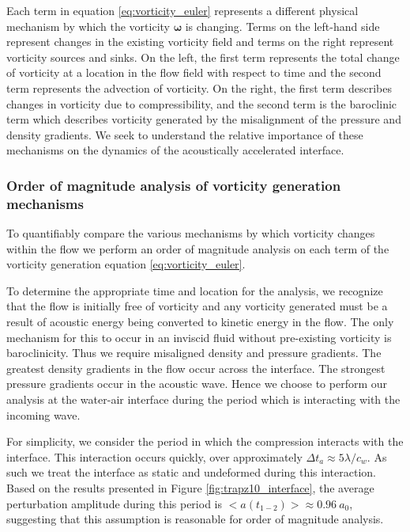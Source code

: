 Each term in equation \eqref{eq:vorticity_euler} represents a
different physical mechanism by which the vorticity
$\boldsymbol{\omega}$ is changing. Terms on the left-hand side
represent changes in the existing vorticity field and terms on the
right represent vorticity sources and sinks. On the left, the first
term represents the total change of vorticity at a location in the
flow field with respect to time and the second term represents the
advection of vorticity. On the right, the first term describes changes
in vorticity due to compressibility, and the second term is the
baroclinic term which describes vorticity generated by the
misalignment of the pressure and density gradients. We
seek to understand the relative importance of these mechanisms on the
dynamics of the acoustically accelerated interface.
% 
% 
\subsubsection{Order of magnitude analysis of vorticity generation mechanisms}
\label{subsubsec:oom_analysis}
To quantifiably compare the various mechanisms by which vorticity
changes within the flow we perform an order of magnitude analysis on
each term of the vorticity generation equation
\eqref{eq:vorticity_euler}.

To determine the appropriate time and location for the analysis, we
recognize that the flow is initially free of vorticity and any
vorticity generated must be a result of acoustic energy being
converted to kinetic energy in the flow. The only mechanism for
this to occur in an inviscid fluid without pre-existing vorticity is
baroclinicity. Thus we require misaligned density and pressure
gradients. The greatest density gradients in the flow occur across the
interface. The strongest pressure gradients occur in the acoustic
wave. Hence we choose to perform our analysis at the water-air
interface during the period which is interacting with the incoming
wave.

For simplicity, we consider the period in which the compression
interacts with the interface. This interaction occurs
quickly, over approximately $\Delta t_a\approx5\lambda/c_{w}$. As such
we treat the interface as static and undeformed during this
interaction. Based on the results presented in Figure
\ref{fig:trapz10_interface}, the average perturbation amplitude during
this period is $<a(t_{1-2})>\approx0.96\ a_0$, suggesting that this
assumption is reasonable for order of magnitude analysis.

